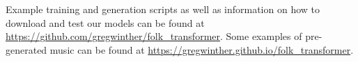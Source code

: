 \documentclass{IEEEtran}
\begin{document}
\appendix

Example training and generation scripts as well as information on how to 
download and test our models can be found
at \url{https://github.com/gregwinther/folk_transformer}. Some examples of
pre-generated music can be found
at \url{https://gregwinther.github.io/folk_transformer}.


\vspace{3em}

\printbibliography
\end{document}
